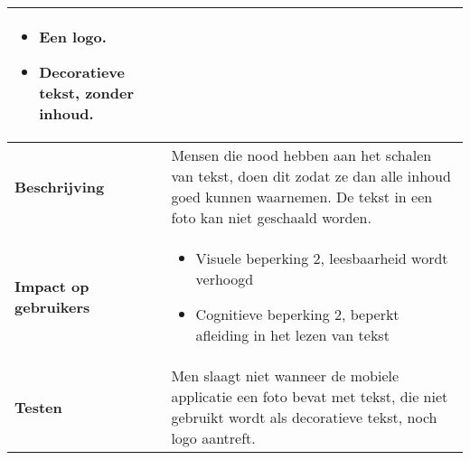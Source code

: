 \begin{table}[H]
\begin{tabular}{|l|p{12cm}|}
        \begin{itemize}
            \item Een logo.
            \item Decoratieve tekst, zonder inhoud.
        \end{itemize}                                                                                                                                                                                                   \\ 
        \hline
        \textbf{Beschrijving}                 & Mensen die nood hebben aan het schalen van tekst, doen dit zodat ze dan alle inhoud goed kunnen waarnemen. De tekst in een foto kan niet geschaald worden.\\ 
        \hline
        \textbf{Impact op gebruikers}         &  
        \begin{itemize}
            \item Visuele beperking 2, leesbaarheid wordt verhoogd 
            \item Cognitieve beperking 2, beperkt afleiding in het lezen van tekst
        \end{itemize}                                                                                                                                                                                                                       \\ 
        \hline
        \textbf{Testen}                       & Men slaagt niet wanneer de mobiele applicatie een foto bevat met tekst, die niet gebruikt wordt als decoratieve tekst, noch logo aantreft.                                                                                                                                                                                  \\
        \hline
    \end{tabular}
\end{table}


